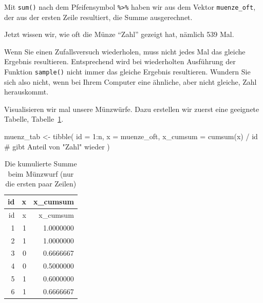 \documentclass[
  a4paper,
  DIV=11]{scrreprt}
\newenvironment{Shaded}{\begin{snugshade}}{\end{snugshade}}
\newcommand{\AttributeTok}[1]{\textcolor[rgb]{0.40,0.45,0.13}{#1}}
\newcommand{\CommentTok}[1]{\textcolor[rgb]{0.37,0.37,0.37}{#1}}
\newcommand{\DecValTok}[1]{\textcolor[rgb]{0.68,0.00,0.00}{#1}}
\newcommand{\FunctionTok}[1]{\textcolor[rgb]{0.28,0.35,0.67}{#1}}
\newcommand{\NormalTok}[1]{\textcolor[rgb]{0.00,0.23,0.31}{#1}}
\newcommand{\OtherTok}[1]{\textcolor[rgb]{0.00,0.23,0.31}{#1}}
\newcommand{\SpecialCharTok}[1]{\textcolor[rgb]{0.37,0.37,0.37}{#1}}
\theoremstyle{definition}
\theoremstyle{remark}
\begin{document}
Mit \texttt{sum()} nach dem Pfeifensymbol \texttt{\%\textgreater{}\%}
haben wir aus dem Vektor \texttt{muenze\_oft}, der aus der ersten Zeile
resultiert, die Summe ausgerechnet.

Jetzt wissen wir, wie oft die Münze ``Zahl'' gezeigt hat, nämlich 539
Mal.

\begin{tcolorbox}[enhanced jigsaw, title=\textcolor{quarto-callout-note-color}{\faInfo}\hspace{0.5em}{Hinweis}, bottomtitle=1mm, bottomrule=.15mm, titlerule=0mm, colbacktitle=quarto-callout-note-color!10!white, colframe=quarto-callout-note-color-frame, leftrule=.75mm, left=2mm, toprule=.15mm, colback=white, arc=.35mm, breakable, toptitle=1mm, opacityback=0, rightrule=.15mm, coltitle=black, opacitybacktitle=0.6]

Wenn Sie einen Zufallsversuch wiederholen, muss nicht jedes Mal das
gleiche Ergebnis resultieren. Entsprechend wird bei wiederholten
Ausführung der Funktion \texttt{sample()} nicht immer das gleiche
Ergebnis resultieren. Wundern Sie sich also nicht, wenn bei Ihrem
Computer eine ähnliche, aber nicht gleiche, Zahl herauskommt.

\end{tcolorbox}

Visualisieren wir mal unsere Münzwürfe. Dazu erstellen wir zuerst eine
geeignete Tabelle, Tabelle~\ref{tbl-muenz}.

\begin{Shaded}
\begin{Highlighting}[]
\NormalTok{muenz\_tab }\OtherTok{\textless{}{-}}
  \FunctionTok{tibble}\NormalTok{(}
    \AttributeTok{id =} \DecValTok{1}\SpecialCharTok{:}\NormalTok{n,}
    \AttributeTok{x =}\NormalTok{ muenze\_oft,}
    \AttributeTok{x\_cumsum =} \FunctionTok{cumsum}\NormalTok{(x) }\SpecialCharTok{/}\NormalTok{ id  }\CommentTok{\# gibt Anteil von "Zahl" wieder}
\NormalTok{  )}
\end{Highlighting}
\end{Shaded}

\hypertarget{tbl-muenz}{}
\begin{longtable}[]{@{}rrr@{}}
\caption{\label{tbl-muenz}Die kumulierte Summe beim Münzwurf (nur die
ersten paar Zeilen)}\tabularnewline
\toprule()
id & x & x\_cumsum \\
\midrule()
\endfirsthead
\toprule()
id & x & x\_cumsum \\
\midrule()
\endhead
1 & 1 & 1.0000000 \\
2 & 1 & 1.0000000 \\
3 & 0 & 0.6666667 \\
4 & 0 & 0.5000000 \\
5 & 1 & 0.6000000 \\
6 & 1 & 0.6666667 \\
\bottomrule()
\end{longtable}
\end{document}
